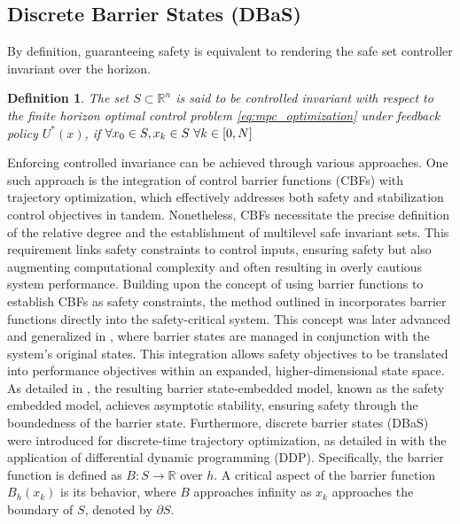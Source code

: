 \documentclass[english]{cccconf}
\newtheorem{definition}{Definition}
\begin{document}
\subsection{Discrete Barrier States (DBaS)}
By definition, guaranteeing safety is equivalent to rendering the safe set controller invariant over the horizon. 
\begin{definition}\label{def:control-invariant}
    The set $S \subset \mathbb{R}^n$ is said to be controlled invariant with respect to the finite horizon optimal control problem \eqref{eq:mpc_optimization} under feedback policy $U^*(x)$, if $\forall x_0 \in S, x_k \in S  \  \forall \space k \in [0, N] $
\end{definition}
Enforcing controlled invariance can be achieved through various approaches. One such approach is the integration of control barrier functions (CBFs) with trajectory optimization, which effectively addresses both safety and stabilization control objectives in tandem. Nonetheless, CBFs necessitate the precise definition of the relative degree and the establishment of multilevel safe invariant sets. This requirement links safety constraints to control inputs, ensuring safety but also augmenting computational complexity and often resulting in overly cautious system performance. Building upon the concept of using barrier functions to establish CBFs as safety constraints, the method outlined in \cite{khan2020gaussian} incorporates barrier functions directly into the safety-critical system. This concept was later advanced and generalized in \cite{almubarak2022safety}, where barrier states are managed in conjunction with the system's original states. This integration allows safety objectives to be translated into performance objectives within an expanded, higher-dimensional state space. As detailed in \cite{almubarak2023barrier}, the resulting barrier state-embedded model, known as the safety embedded model, achieves asymptotic stability, ensuring safety through the boundedness of the barrier state. Furthermore, discrete barrier states (DBaS) were introduced for discrete-time trajectory optimization, as detailed in \cite{kuperman2023improved} with the application of differential dynamic programming (DDP). Specifically, the barrier function is defined as $B : S \rightarrow \mathbb{R}$ over $h$. A critical aspect of the barrier function $B_h(x_k)$ is its behavior, where $B$ approaches infinity as $x_k$ approaches the boundary of $S$, denoted by $\partial S$.
\end{document}

